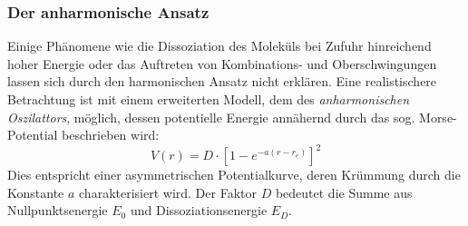 \documentclass[12pt]{article}
\begin{document}
\subsubsection{Der anharmonische Ansatz}
Einige Phänomene wie die Dissoziation des Moleküls bei Zufuhr
hinreichend hoher Energie oder das Auftreten von Kombinations- und Oberschwingungen lassen sich durch den
harmonischen Ansatz nicht erklären. Eine realistischere Betrachtung ist mit einem erweiterten Modell, dem des
\textit{anharmonischen Oszilattors}, möglich, dessen potentielle Energie annähernd durch das sog. Morse-Potential
beschrieben wird:
\begin{equation}
  V(r) = D \cdot [ 1- e^{-a(r-r_e)} ]^2
\end{equation}
Dies entspricht einer asymmetrischen Potentialkurve, deren Krümmung durch die Konstante $a$ charakterisiert wird. Der Faktor $D$
bedeutet die Summe aus Nullpunktsenergie $E _0$ und Dissoziationsenergie $E _D$.
\end{document}
